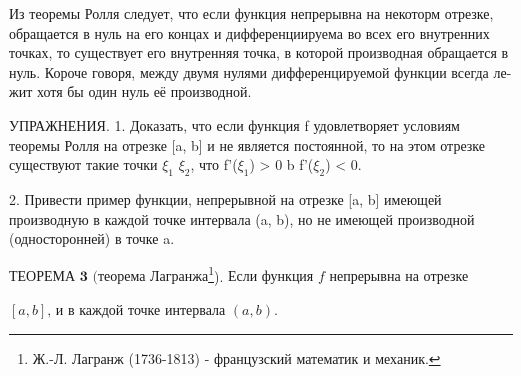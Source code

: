 \documentclass[book, 12pt]{article}
\begin{document}
Из теоремы Ролля следует, что если функция непрерывна на некоторм отрезке, обращается в нуль на его концах и
дифференциируема во всех его внутренних точках, то существует его внутренняя точка, в которой производная обращается в нуль.
Короче говоря, $\textit{между двумя нулями дифференцируемой функции всегда ле-}$
$\textit{жит хотя бы один нуль её производной.}$

\setlength{\parindent}{0cm}
{\footnotesize УПРАЖНЕНИЯ. 1. Доказать, что если функция f удовлетворяет условиям теоремы Ролля на отрезке [a, b]
и не является постоянной, то на этом отрезке существуют такие точки $\xi_1$ $\xi_2$, что f'($\xi_1$) > 0 b f'($\xi_2$) < 0.\par}

{\footnotesize 2. Привести пример функции, непрерывной на отрезке [a, b] имеющей производную в каждой точке
интервала (a, b), но не имеющей производной (односторонней) в точке a.\par}

$\textbf{ТЕОРЕМА 3 (теорема Лагранжа}$\footnote[1]{Ж.-Л. Лагранж (1736-1813) - французский математик и механик.}).
$\textit{Если функция f непрерывна на отрезке}$

$\textit{$[a, b]$, и в каждой точке интервала $(a, b).$}$
\end{document}
